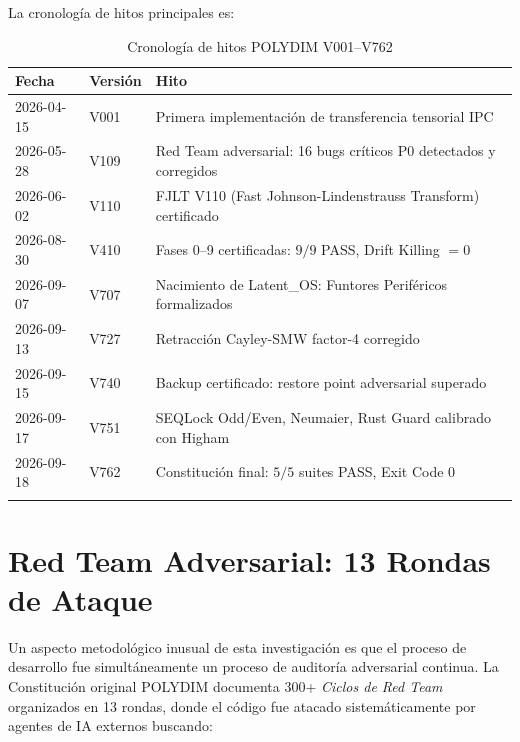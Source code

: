 La cronología de hitos principales es:

\begin{longtable}{llp{8cm}}
\toprule
\textbf{Fecha} & \textbf{Versión} & \textbf{Hito} \\
\midrule
2026-04-15 & V001 & Primera implementación de transferencia tensorial IPC \\
2026-05-28 & V109 & Red Team adversarial: 16 bugs críticos P0 detectados y corregidos \\
2026-06-02 & V110 & FJLT V110 (Fast Johnson-Lindenstrauss Transform) certificado \\
2026-08-30 & V410 & Fases 0--9 certificadas: $9/9$ PASS, Drift Killing $= 0$ \\
2026-09-07 & V707 & Nacimiento de Latent\_OS: Funtores Periféricos formalizados \\
2026-09-13 & V727 & Retracción Cayley-SMW factor-4 corregido \\
2026-09-15 & V740 & Backup certificado: restore point adversarial superado \\
2026-09-17 & V751 & SEQLock Odd/Even, Neumaier, Rust Guard calibrado con Higham \\
2026-09-18 & V762 & Constitución final: $5/5$ suites PASS, Exit Code 0 \\
\bottomrule
\caption{Cronología de hitos POLYDIM V001--V762}
\label{tab:cronologia}
\end{longtable}

\section{Red Team Adversarial: 13 Rondas de Ataque}

Un aspecto metodológico inusual de esta investigación es que el proceso de
desarrollo fue simultáneamente un proceso de auditoría adversarial continua.
La Constitución original POLYDIM documenta 300+ \textit{Ciclos de Red Team}
organizados en 13 rondas, donde el código fue atacado sistemáticamente por
agentes de IA externos buscando:


